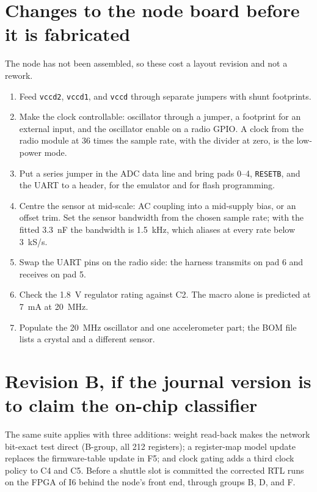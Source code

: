 \documentclass[10pt]{article}
\begin{document}
\section{Changes to the node board before it is fabricated}
\label{app:board}
The node has not been assembled, so these cost a layout revision and not
a rework.
\begin{enumerate}
\item Feed \texttt{vccd2}, \texttt{vccd1}, and \texttt{vccd} through
separate jumpers with shunt footprints.
\item Make the clock controllable: oscillator through a jumper, a
footprint for an external input, and the oscillator enable on a radio
GPIO. A clock from the radio module at 36 times the sample rate, with the
divider at zero, is the low-power mode.
\item Put a series jumper in the ADC data line and bring pads 0--4,
\texttt{RESETB}, and the UART to a header, for the emulator and for flash
programming.
\item Centre the sensor at mid-scale: AC coupling into a mid-supply bias,
or an offset trim. Set the sensor bandwidth from the chosen sample rate;
with the fitted \SI{3.3}{\nano\farad} the bandwidth is
\SI{1.5}{\kilo\hertz}, which aliases at every rate below
\SI{3}{kS/s}.
\item Swap the UART pins on the radio side: the harness transmits on
pad 6 and receives on pad 5.
\item Check the \SI{1.8}{\volt} regulator rating against C2. The macro
alone is predicted at \SI{7}{\milli\ampere} at \SI{20}{\mega\hertz}.
\item Populate the \SI{20}{\mega\hertz} oscillator and one accelerometer
part; the BOM file lists a crystal and a different sensor.
\end{enumerate}

\section{Revision B, if the journal version is to claim the on-chip classifier}
The same suite applies with three additions: weight read-back makes the
network bit-exact test direct (B-group, all 212 registers); a
register-map model update replaces the firmware-table update in F5; and
clock gating adds a third clock policy to C4 and C5. Before a shuttle
slot is committed the corrected RTL runs on the FPGA of I6 behind the
node's front end, through groups B, D, and F.
\end{document}
